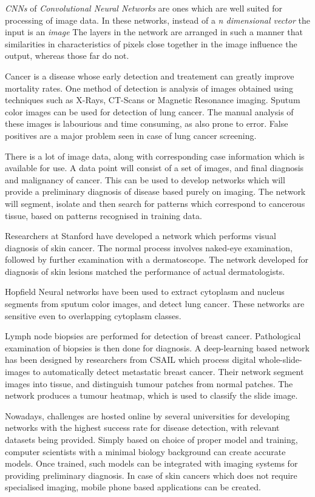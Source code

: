 \documentclass[11pt,a4paper]{article}
\begin{document}
\emph{CNNs} of \emph{Convolutional Neural Networks} are ones which are well suited for processing of image data. In these networks, instead of a \emph{n dimensional vector} the input is an \emph{image} The layers in the network are arranged in such a manner that similarities in characteristics of pixels close together in the image influence the output, whereas those far do not.

Cancer is a disease whose early detection and treatement can greatly improve mortality rates. One method of detection is analysis of images obtained using techniques such as X-Rays, CT-Scans or Magnetic Resonance imaging. Sputum color images can be used for detection of lung cancer. The manual analysis of these images is labourious and time consuming, as also prone to error. False positives are a major problem seen in case of lung cancer screening.\cite{wikipedia} 

There is a lot of image data, along with corresponding case information which is available for use. A data point will consist of a set of images, and final diagnosis and malignancy of cancer. This can be used to develop networks which will provide a preliminary diagnosis of disease based purely on imaging. The network will segment, isolate and then search for patterns which correspond to cancerous tissue, based on patterns recognised in training data.

Researchers at Stanford have developed a network which performs visual diagnosis of skin cancer. The normal process involves naked-eye examination, followed by further examination with a dermatoscope. The network developed for diagnosis of skin lesions matched the performance of actual dermatologists.\cite{skin}

Hopfield Neural networks have been used to extract cytoplasm and nucleus segments from sputum color images, and detect lung cancer. These networks are sensitive even to overlapping cytoplasm classes. \cite{hnn}

Lymph node biopsies are performed for detection of breast cancer. Pathological examination of biopsies is then done for diagnosis. A deep-learning based network has been designed by researchers from CSAIL which process digital whole-slide-images to automatically detect metastatic breast cancer. Their network segment images into tissue, and distinguish tumour patches from normal patches. The network produces a tumour heatmap, which is used to classify the slide image.\cite{csail}

Nowadays, challenges are hosted online by several universities for developing networks with the highest success rate for disease detection, with relevant datasets being provided. Simply based on choice of proper model and training, computer scientists with a minimal biology background can create accurate models. Once trained, such models can be integrated with imaging systems for providing preliminary diagnosis. In case of skin cancers which does not require specialised imaging, mobile phone based applications can be created.\cite{skin}
\end{document}
